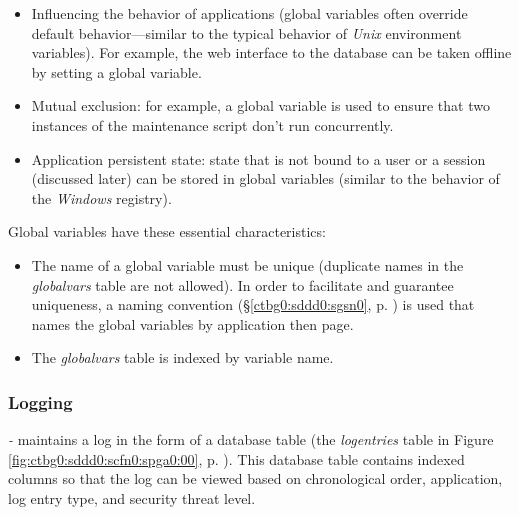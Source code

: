 \begin{itemize}
\item Influencing the behavior of applications (global variables often override
      default behavior---similar to the typical behavior of \emph{Unix} environment
      variables).  For example, the web interface to the database can be taken
      offline by setting a global variable.
\item Mutual exclusion:  for example, a global variable is used to ensure that two instances
      of the maintenance script don't run concurrently.
\item Application persistent state:  state that is not bound to a user or a session
      (discussed later) can be stored in global variables (similar to the behavior of
      the \emph{Windows} registry).
\end{itemize}

Global variables have these essential characteristics:

\begin{itemize}
\item The name of a global variable must be unique (duplicate names in the 
      \emph{globalvars} table are not allowed).  In order to facilitate and 
      guarantee uniqueness, a naming convention
      (\S{}\ref{ctbg0:sddd0:sgsn0}, p. \pageref{ctbg0:sddd0:sgsn0}) is used that
      names the global variables by application then page.
\item The \emph{globalvars} table is indexed by variable name.
\end{itemize}


\subsubsection{Logging}
\label{ctbg0:sddd0:scfn0:slog0}

\emph{\productbasename{}-\productversion{}} maintains a log in the form of
a database table (the \emph{logentries} table in Figure \ref{fig:ctbg0:sddd0:scfn0:spga0:00},
p. \pageref{fig:ctbg0:sddd0:scfn0:spga0:00}).  This database table
contains indexed columns so that the log can be viewed based on
chronological order, application, log entry type, and security threat level.


